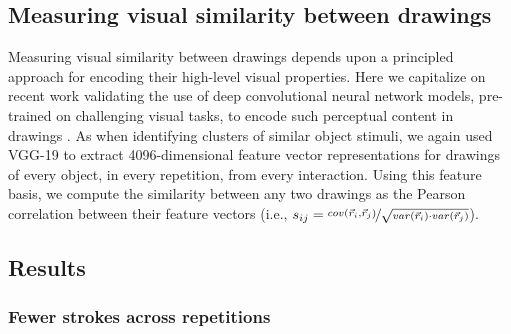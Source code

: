 \documentclass[10pt,letterpaper]{article}
\begin{document}



\subsection{Measuring visual similarity between drawings}

Measuring visual similarity between drawings depends upon a principled approach for encoding their high-level visual properties.
Here we capitalize on recent work validating the use of deep convolutional neural network models, pre-trained on challenging visual tasks, to encode such perceptual content in drawings \cite{FanCommon2018}.
As when identifying clusters of similar object stimuli, we again used VGG-19 to extract 4096-dimensional feature vector representations for drawings of every object, in every repetition, from every interaction.
Using this feature basis, we compute the similarity between any two drawings as the Pearson correlation between their feature vectors (i.e., $s_{ij} =  \nicefrac{cov(\vec{r}_{i}, \vec{r}_{j})}{\sqrt{var(\vec{r}_{i}) \cdot var(\vec{r}_{j})}}$).

\subsection{Results}
\subsubsection{Fewer strokes across repetitions}
\end{document}
